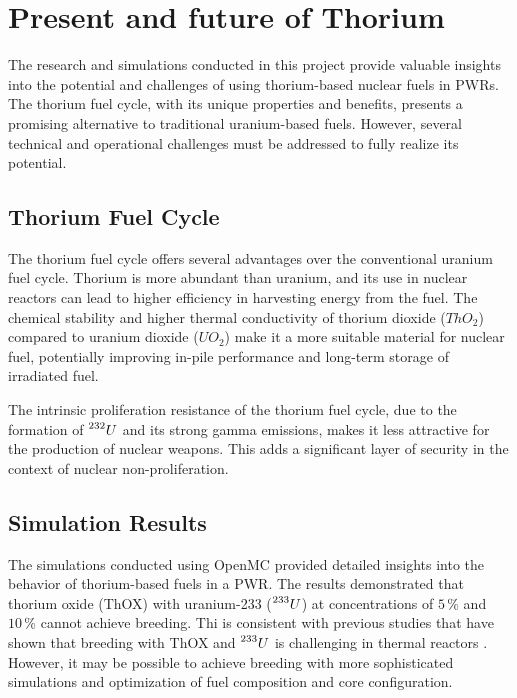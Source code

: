 \chapter{Present and future of Thorium}

The research and simulations conducted in this project provide valuable insights into the potential and challenges of using thorium-based nuclear fuels in PWRs. The thorium fuel cycle, with its unique properties and benefits, presents a promising alternative to traditional uranium-based fuels. However, several technical and operational challenges must be addressed to fully realize its potential.

\section{Thorium Fuel Cycle}

The thorium fuel cycle offers several advantages over the conventional uranium fuel cycle. Thorium is more abundant than uranium, and its use in nuclear reactors can lead to higher efficiency in harvesting energy from the fuel. The chemical stability and higher thermal conductivity of thorium dioxide (\(ThO_2\)) compared to uranium dioxide (\(UO_2\)) make it a more suitable material for nuclear fuel, potentially improving in-pile performance and long-term storage of irradiated fuel.

The intrinsic proliferation resistance of the thorium fuel cycle, due to the formation of \(\prescript{232}{}{U}\) and its strong gamma emissions, makes it less attractive for the production of nuclear weapons. This adds a significant layer of security in the context of nuclear non-proliferation.

\section{Simulation Results}

The simulations conducted using OpenMC provided detailed insights into the behavior of thorium-based fuels in a PWR. The results demonstrated that thorium oxide (ThOX) with uranium-233 (\(\prescript{233}{}{U}\)) at concentrations of \(5 \, \%\) and \(10 \, \%\) cannot achieve breeding. Thi is consistent with previous studies that have shown that breeding with ThOX and \(\prescript{233}{}{U}\) is challenging in thermal reactors \cite{roadmap}. However, it may be possible to achieve breeding with more sophisticated simulations and optimization of fuel composition and core configuration.

